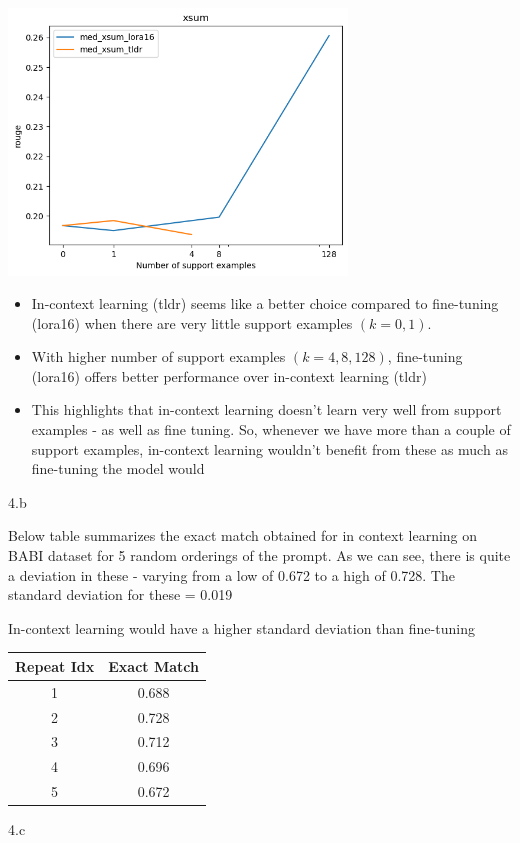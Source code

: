 \begin{answer}

\includegraphics[width=9cm]{figures/lora_vs_icl_xsum_plot.png}

\begin{itemize}
    \item In-context learning (tldr) seems like a better choice compared to fine-tuning (lora16) when there are very little support examples $(k=0, 1)$. 
    \item With higher number of support examples $(k = 4, 8, 128)$, fine-tuning (lora16) offers better performance over in-context learning (tldr)
    \item This highlights that in-context learning doesn't learn very well from support examples - as well as fine tuning. So, whenever we have more than a couple of support examples, in-context learning wouldn't benefit from these as much as fine-tuning the model would
\end{itemize}
\end{answer}

\LARGE
4.b
\normalsize

\begin{answer}
Below table summarizes the exact match obtained for in context learning on BABI dataset for 5 random orderings of the prompt. As we can see, there is quite a deviation in these - varying from a low of 0.672 to a high of 0.728. The standard deviation for these = 0.019

In-context learning would have a higher standard deviation than fine-tuning

\begin{center}
\begin{tabular}{c c}
 \hline
 \hline
 Repeat Idx & Exact Match \\ [0.5ex] 
 \hline\hline
1 & 0.688 \\
 \hline
2 & 0.728 \\
 \hline
3 & 0.712 \\
 \hline
4 & 0.696 \\
 \hline
5 & 0.672 \\
 \hline
\end{tabular}
\end{center}

\end{answer}

\LARGE
4.c
\normalsize

\begin{answer}
\end{answer}


